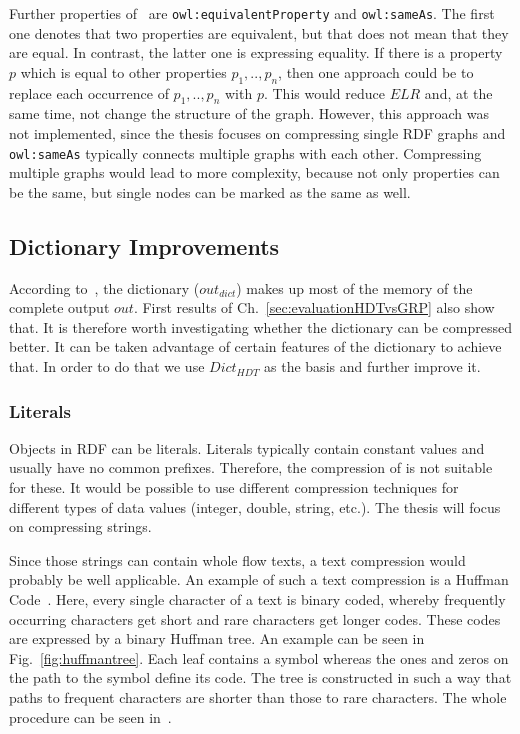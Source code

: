 Further properties of~\cite{owl} are {\tt owl:equivalentProperty} and {\tt owl:sameAs}. The first one denotes that two properties are equivalent, but that does not mean that they are equal. In contrast, the latter one is expressing equality. If there is a property $p$ which is equal to other properties $p_1,..,p_n$, then one approach could be to replace each occurrence of $p_1,..,p_n$ with $p$. This would reduce $ELR$ and, at the same time, not change the structure of the graph. However, this approach was not implemented, since the thesis focuses on compressing single RDF graphs and {\tt owl:sameAs} typically connects multiple graphs with each other. Compressing multiple graphs would lead to more complexity, because not only properties can be the same, but single nodes can be marked as the same as well.


\subsection{Dictionary Improvements}\label{sec:approachDictImprovements}


According to~\cite{hdt}, the dictionary ($out_{dict}$) makes up most of the memory of the complete output $out$. First results of Ch.~\ref{sec:evaluationHDTvsGRP} also show that. It is therefore worth investigating whether the dictionary can be compressed better. It can be taken advantage of certain features of the dictionary to achieve that. In order to do that we use $Dict_{HDT}$ as the basis and further improve it.

\subsubsection{Literals}\label{sec:approachLiterals}

Objects in RDF can be literals. Literals typically contain constant values and usually have no common prefixes. Therefore, the compression of \DHDT{} is not suitable for these. It would be possible to use different compression techniques for different types of data values (integer, double, string, etc.). The thesis will focus on compressing strings.

Since those strings can contain whole flow texts, a text compression would probably be well applicable. An example of such a text compression is a Huffman Code~\cite{huffman}. Here, every single character of a text is binary coded, whereby frequently occurring characters get short and rare characters get longer codes. These codes are expressed by a binary Huffman tree. An example can be seen in Fig.~\ref{fig:huffmantree}. Each leaf contains a symbol whereas the ones and zeros on the path to the symbol define its code. The tree is constructed in such a way that paths to frequent characters are shorter than those to rare characters. The whole procedure can be seen in~\cite{huffman}.

